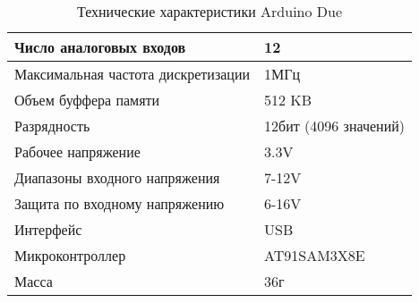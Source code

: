 \documentclass[../main.tex]{subfiles}
\begin{document}
\begin{table}[H]
\centering
\caption{Технические характеристики Arduino Due}

\begin{tabular}{|l|l|}
                                                                      \hline
Число аналоговых входов            & 12                            \\ \hline
Максимальная частота дискретизации & 1МГц                          \\ \hline
Объем буффера памяти               & 512 KB					               \\ \hline
Разрядность                        & 12бит (4096 значений)         \\ \hline
Рабочее напряжение                 & 3.3V                          \\ \hline
Диапазоны входного напряжения      & 7-12V                         \\ \hline
Защита по входному напряжению      & 6-16V                         \\ \hline
Интерфейс                          & USB                           \\ \hline
Микроконтроллер                    & AT91SAM3X8E                   \\ \hline
Масса                              & 36г                           \\ \hline
\end{tabular}
\end{table}

\newpage
\end{document}
